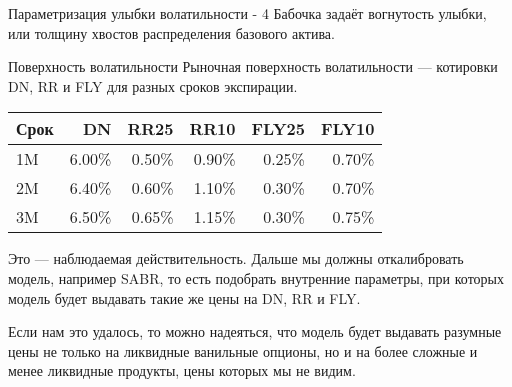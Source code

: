 \documentclass{beamer}
\begin{document}
\begin{frame}{Параметризация улыбки волатильности - 4}
\justify
Бабочка задаёт вогнутость улыбки, или толщину хвостов распределения базового актива.

\centering
{}
\end{frame}



\begin{frame}{Поверхность волатильности}
\justify
Рыночная поверхность волатильности --- котировки DN, RR и FLY для разных сроков экспирации.

\justify
\centering
\begin{tabular}{l|r|r|r|r|r}
Срок & DN     & RR25   & RR10   & FLY25  & FLY10  \\ \hline
1M   & 6.00\% & 0.50\% & 0.90\% & 0.25\% & 0.70\% \\
2M   & 6.40\% & 0.60\% & 1.10\% & 0.30\% & 0.70\% \\
3M   & 6.50\% & 0.65\% & 1.15\% & 0.30\% & 0.75\% 
\end{tabular}

\justify
Это --- наблюдаемая действительность. Дальше мы должны откалибровать модель, например SABR, то есть подобрать внутренние параметры, при которых модель будет выдавать такие же цены на DN, RR и FLY.

\justify
Если нам это удалось, то можно надеяться, что модель будет выдавать разумные цены не только на ликвидные ванильные опционы, но и на более сложные и менее ликвидные продукты, цены которых мы не видим.
\end{frame}
\end{document}
